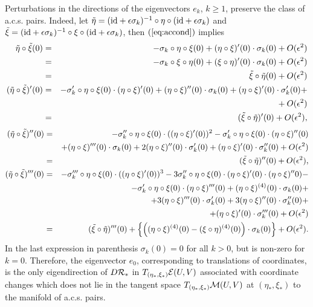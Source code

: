 {Perturbations in the  directions of the eigenvectors $e_k$, $k \ge 1$, preserve the class of a.c.s. pairs. Indeed, let $\tilde{\eta}=({\rm id} +\epsilon \sigma_k)^{-1} \circ \eta \circ  ({\rm id} +\epsilon \sigma_k)$ and $\tilde{\xi}=({\rm id} +\epsilon \sigma_k)^{-1} \circ \xi \circ  ({\rm id} +\epsilon \sigma_k)$, then $(\ref{eq:accond})$ implies
\begin{eqnarray}
\nonumber \tilde{\eta} \circ \tilde{\xi}(0)&=& -\sigma_k \circ \eta \circ \xi(0)  + (\eta \circ \xi) '(0) \cdot \sigma_k(0) +O(\epsilon^2)\\
\nonumber &=&-\sigma_k \circ \xi \circ \eta(0)  + (\xi \circ \eta) '(0) \cdot \sigma_k(0) +O(\epsilon^2)\\
\nonumber &=&\tilde{\xi} \circ \tilde{\eta}(0)+O(\epsilon^2) \\
\nonumber (\tilde{\eta} \circ \tilde{\xi})'(0)&=& -\sigma_k' \circ \eta \circ \xi(0) \cdot  (\eta \circ \xi)'(0)    + (\eta \circ \xi) ''(0) \cdot \sigma_k(0)+ (\eta \circ \xi) '(0) \cdot \sigma_k'(0)+\\
\nonumber &\phantom{=}& \phantom{-\sigma_k' \circ \eta \circ \xi(0) \cdot  (\eta \circ \xi)'(0)    + (\eta \circ \xi) ''(0) \cdot \sigma_k(0)} + O(\epsilon^2) \\
\nonumber &=&(\tilde{\xi} \circ \tilde{\eta})'(0)+O(\epsilon^2),
\end{eqnarray}
\begin{eqnarray}
\nonumber (\tilde{\eta} \circ \tilde{\xi})''(0)&=& -\sigma_k'' \circ \eta \circ \xi(0) \cdot  ((\eta \circ \xi)'(0))^2-\sigma_k' \circ \eta \circ \xi(0) \cdot  (\eta \circ \xi)''(0)   \\
\nonumber &\phantom{=}&+ (\eta \circ \xi) '''(0) \cdot \sigma_k(0)+2 (\eta \circ \xi) ''(0) \cdot \sigma_k'(0)+ (\eta \circ \xi) '(0) \cdot \sigma_k''(0)+O(\epsilon^2)\\
\nonumber &=&(\tilde{\xi} \circ \tilde{\eta})''(0)+O(\epsilon^2), \\
\nonumber (\tilde{\eta} \circ \tilde{\xi})'''(0)&=& -\sigma_k''' \circ \eta \circ \xi(0) \cdot  ((\eta \circ \xi)'(0))^3-3 \sigma_k'' \circ \eta \circ \xi(0) \cdot (\eta \circ \xi)'(0) \cdot  (\eta \circ \xi)''0) -\\\nonumber &\phantom{=}& -\sigma_k' \circ \eta \circ \xi(0) \cdot  (\eta \circ \xi)'''(0)  + (\eta \circ \xi)^{(4)}(0) \cdot \sigma_k(0) +\\
\nonumber &\phantom{=}& +3 (\eta \circ \xi) '''(0) \cdot \sigma_k'(0)+3 (\eta \circ \xi) ''(0) \cdot \sigma_k''(0)+\\
\nonumber &\phantom{=}& +(\eta \circ \xi) '(0) \cdot \sigma_k'''(0) +O(\epsilon^2) \\
\nonumber &=&(\tilde{\xi} \circ \tilde{\eta})'''(0)+\left\{ \left( (\eta \circ \xi)^{(4)}(0)-(\xi \circ \eta)^{(4)}(0) \right) \cdot \sigma_k(0) \right\}+O(\epsilon^2). 
\end{eqnarray}
In the last expression in parenthesis $\sigma_k(0)=0$ for all $k > 0$, but is non-zero for $k=0$. Therefore, the eigenvector $e_0$, corresponding to translations of coordinates, is the only eigendirection of $D \mathcal{R}_*$ in $T_{(\eta_*,\xi_*)}\mathcal{E}(U,V)$  associated with coordinate changes which does not lie in the tangent space $T_{(\eta_*,\xi_*)}\mathcal{M}(U,V)$ at $(\eta_*,\xi_*)$ to the manifold of a.c.s. pairs.

}
